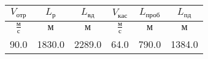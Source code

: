 \begin{tabular}{|c|c|c|c|c|c|}
\hline
$V_{отр}$ & $L_{р}$ & $L_{вд}$ & $V_{кас}$ & $L_{проб}$ & $L_{пд}$ \\ 
\hline
$\frac{м}{с}$ & $м$ & $м$ & $\frac{м}{с}$ & $м$ & $м$ \\ 
\hline
90.0 & 1830.0 & 2289.0 & 64.0 & 790.0 & 1384.0 \\ 
\hline
\end{tabular}